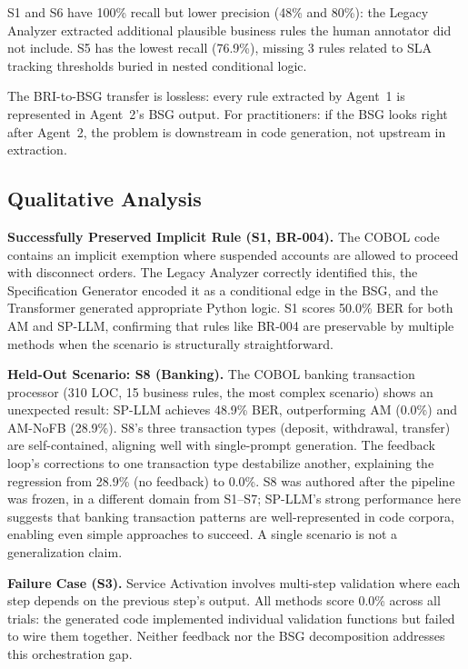 \documentclass[conference]{IEEEtran}
\begin{document}
S1 and S6 have 100\% recall but lower precision (48\% and 80\%): the Legacy Analyzer extracted additional plausible business rules the human annotator did not include. S5 has the lowest recall (76.9\%), missing 3 rules related to SLA tracking thresholds buried in nested conditional logic.

The BRI-to-BSG transfer is lossless: every rule extracted by Agent~1 is represented in Agent~2's BSG output. For practitioners: if the BSG looks right after Agent~2, the problem is downstream in code generation, not upstream in extraction.

\subsection{Qualitative Analysis}

\textbf{Successfully Preserved Implicit Rule (S1, BR-004).} The COBOL code contains an implicit exemption where suspended accounts are allowed to proceed with disconnect orders. The Legacy Analyzer correctly identified this, the Specification Generator encoded it as a conditional edge in the BSG, and the Transformer generated appropriate Python logic. S1 scores 50.0\% BER for both AM and SP-LLM, confirming that rules like BR-004 are preservable by multiple methods when the scenario is structurally straightforward.

\textbf{Held-Out Scenario: S8 (Banking).} The COBOL banking transaction processor (310 LOC, 15 business rules, the most complex scenario) shows an unexpected result: SP-LLM achieves 48.9\% BER, outperforming AM (0.0\%) and AM-NoFB (28.9\%). S8's three transaction types (deposit, withdrawal, transfer) are self-contained, aligning well with single-prompt generation. The feedback loop's corrections to one transaction type destabilize another, explaining the regression from 28.9\% (no feedback) to 0.0\%. S8 was authored after the pipeline was frozen, in a different domain from S1--S7; SP-LLM's strong performance here suggests that banking transaction patterns are well-represented in code corpora, enabling even simple approaches to succeed. A single scenario is not a generalization claim.

\textbf{Failure Case (S3).} Service Activation involves multi-step validation where each step depends on the previous step's output. All methods score 0.0\% across all trials: the generated code implemented individual validation functions but failed to wire them together. Neither feedback nor the BSG decomposition addresses this orchestration gap.
\end{document}
